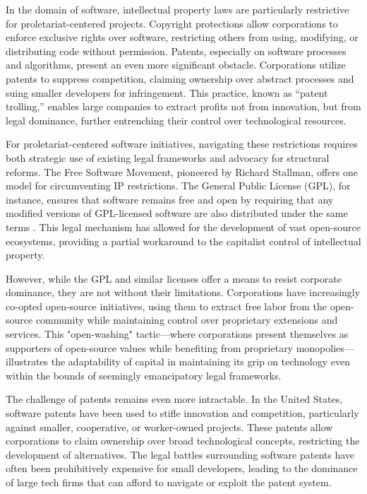 \begin{refsection}
In the domain of software, intellectual property laws are particularly restrictive for proletariat-centered projects. Copyright protections allow corporations to enforce exclusive rights over software, restricting others from using, modifying, or distributing code without permission. Patents, especially on software processes and algorithms, present an even more significant obstacle. Corporations utilize patents to suppress competition, claiming ownership over abstract processes and suing smaller developers for infringement. This practice, known as “patent trolling,” enables large companies to extract profits not from innovation, but from legal dominance, further entrenching their control over technological resources.

For proletariat-centered software initiatives, navigating these restrictions requires both strategic use of existing legal frameworks and advocacy for structural reforms. The Free Software Movement, pioneered by Richard Stallman, offers one model for circumventing IP restrictions. The General Public License (GPL), for instance, ensures that software remains free and open by requiring that any modified versions of GPL-licensed software are also distributed under the same terms \cite[pp.~72]{stallman_free_software}. This legal mechanism has allowed for the development of vast open-source ecosystems, providing a partial workaround to the capitalist control of intellectual property.

However, while the GPL and similar licenses offer a means to resist corporate dominance, they are not without their limitations. Corporations have increasingly co-opted open-source initiatives, using them to extract free labor from the open-source community while maintaining control over proprietary extensions and services. This "open-washing" tactic—where corporations present themselves as supporters of open-source values while benefiting from proprietary monopolies—illustrates the adaptability of capital in maintaining its grip on technology even within the bounds of seemingly emancipatory legal frameworks.

The challenge of patents remains even more intractable. In the United States, software patents have been used to stifle innovation and competition, particularly against smaller, cooperative, or worker-owned projects. These patents allow corporations to claim ownership over broad technological concepts, restricting the development of alternatives. The legal battles surrounding software patents have often been prohibitively expensive for small developers, leading to the dominance of large tech firms that can afford to navigate or exploit the patent system. 


\end{refsection}
